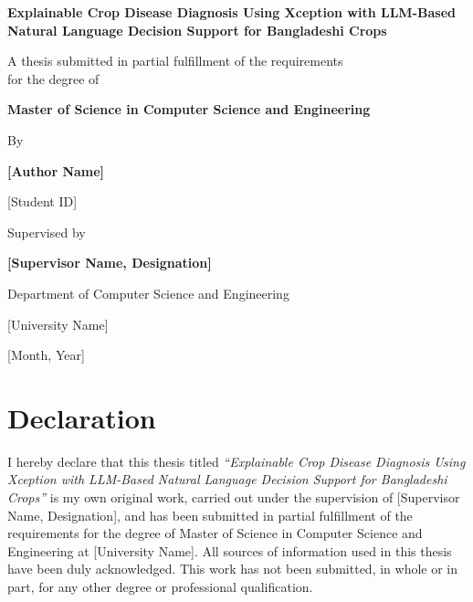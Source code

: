 \documentclass[12pt,a4paper,oneside]{report}
\newcommand{\thesistitle}{Explainable Crop Disease Diagnosis Using Xception with LLM-Based Natural Language Decision Support for Bangladeshi Crops}
\newcommand{\authorname}{[Author Name]}
\newcommand{\studentid}{[Student ID]}
\newcommand{\supervisorname}{[Supervisor Name, Designation]}
\newcommand{\departmentname}{Department of Computer Science and Engineering}
\newcommand{\universityname}{[University Name]}
\newcommand{\submissiondate}{[Month, Year]}
\begin{document}
\begin{titlepage}
\centering
\vspace*{0.5cm}
{\LARGE \bfseries \thesistitle \par}
\vspace{1.2cm}
{\large A thesis submitted in partial fulfillment of the requirements\\ for the degree of\par}
\vspace{0.3cm}
{\large \bfseries Master of Science in Computer Science and Engineering \par}
\vspace{1.5cm}

{\large By \par}
\vspace{0.2cm}
{\large \bfseries \authorname \par}
{\large \studentid \par}

\vspace{1.8cm}
{\large Supervised by \par}
\vspace{0.2cm}
{\large \bfseries \supervisorname \par}

\vfill

\begin{figure}[H]
\centering
{}
\end{figure}

\vfill
{\large \departmentname \par}
{\large \universityname \par}
{\large \submissiondate \par}

\end{titlepage}

\chapter*{Declaration}
I hereby declare that this thesis titled \textit{``\thesistitle''} is my own original work, carried out under the
supervision of \supervisorname{}, and has been submitted in partial fulfillment of the requirements for the degree
of Master of Science in Computer Science and Engineering at \universityname{}. All sources of information used in
this thesis have been duly acknowledged. This work has not been submitted, in whole or in part, for any other
degree or professional qualification.
\end{document}
